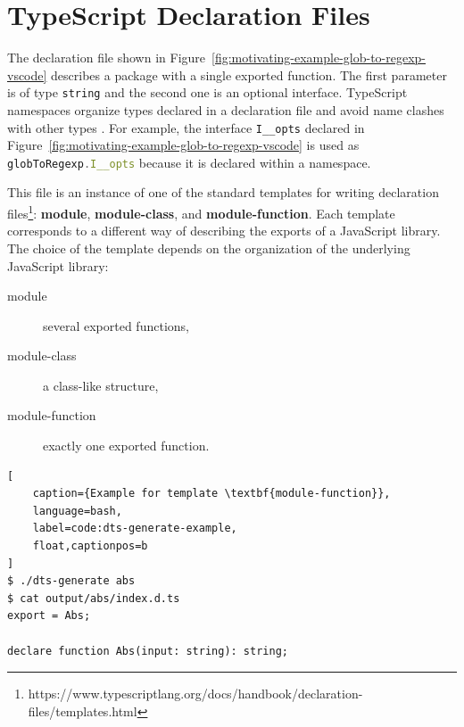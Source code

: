 \documentclass[english,cleveref,autoref,submission]{programming}
\newcommand{\figref}[1]{Figure~\ref{#1}}
\begin{document}

\section{TypeScript Declaration Files}
\label{sec:typescr-decl-files}

The declaration file shown in \figref{fig:motivating-example-glob-to-regexp-vscode}
describes a package with a single exported function. The first parameter is of type
\texttt{string} and the second one is an optional interface. TypeScript namespaces
organize types declared in a declaration file and avoid name clashes with other types
\cite{typescript-namespaces}. For example, the interface \texttt{I\_\_opts} declared in
\figref{fig:motivating-example-glob-to-regexp-vscode} is used as
\lstinline[language=TypeScript]{globToRegexp.I__opts} because it is declared within a
namespace.


This file is an instance of one of the standard templates for writing
declaration
files\footnote{https://www.typescriptlang.org/docs/handbook/declaration-files/templates.html}:
\textbf{module}, \textbf{module-class}, and
\textbf{module-function}. 
Each template corresponds to a different way of describing the exports
of a JavaScript library. The choice of the template depends on the
organization of the underlying JavaScript library:
\begin{description}
\item[module] several exported functions,
\item[module-class] a class-like structure,
\item[module-function] exactly one exported function.
\end{description}

\begin{lstlisting}[
    caption={Example for template \textbf{module-function}},
    language=bash,
	label=code:dts-generate-example,
    float,captionpos=b
]
$ ./dts-generate abs
$ cat output/abs/index.d.ts 
export = Abs;

declare function Abs(input: string): string;
\end{lstlisting}
\end{document}
